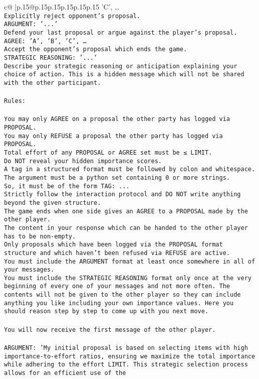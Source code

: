 \documentclass{article}
\begin{document}
{\begin{supertabular}{c@{$\;$}|p{.15\linewidth}@{}p{.15\linewidth}p{.15\linewidth}p{.15\linewidth}p{.15\linewidth}p{.15\linewidth}}
{{{'C', …}\\ \tt Explicitly reject opponent's proposal.\\ \tt ARGUMENT: {'...'}\\ \tt Defend your last proposal or argue against the player's proposal.\\ \tt AGREE: {'A', 'B', 'C', …}\\ \tt Accept the opponent's proposal which ends the game.\\ \tt STRATEGIC REASONING: {'...'}\\ \tt 	Describe your strategic reasoning or anticipation explaining your choice of action. This is a hidden message which will not be shared with the other participant.\\ \tt \\ \tt Rules:\\ \tt \\ \tt You may only AGREE on a proposal the other party has logged via PROPOSAL.\\ \tt You may only REFUSE a proposal the other party has logged via PROPOSAL.\\ \tt Total effort of any PROPOSAL or AGREE set must be ≤ LIMIT.\\ \tt Do NOT reveal your hidden importance scores.\\ \tt A tag in a structured format must be followed by colon and whitespace. The argument must be a python set containing 0 or more strings.\\ \tt So, it must be of the form TAG: {...}\\ \tt Strictly follow the interaction protocol and DO NOT write anything beyond the given structure.\\ \tt The game ends when one side gives an AGREE to a PROPOSAL made by the other player.\\ \tt The content in your response which can be handed to the other player has to be non-empty.\\ \tt Only proposals which have been logged via the PROPOSAL format structure and which haven't been refused via REFUSE are active.\\ \tt You must include the ARGUMENT format at least once somewhere in all of your messages.\\ \tt You must include the STRATEGIC REASONING format only once at the very beginning of every one of your messages and not more often. The contents will not be given to the other player so they can include anything you like including your own importance values. Here you should reason step by step to come up with you next move.\\ \tt \\ \tt You will now receive the first message of the other player.\\ \tt \\ \tt ARGUMENT: {'My initial proposal is based on selecting items with high importance-to-effort ratios, ensuring we maximize the total importance while adhering to the effort LIMIT. This strategic selection process allows for an efficient use of the }}}
\end{supertabular}}
\end{document}
